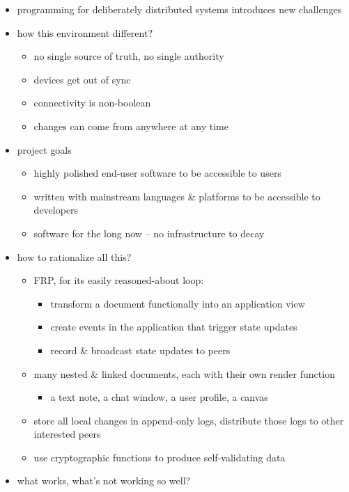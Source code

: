 \documentclass[sigplan,10pt]{acmart}
\begin{document}
\begin{itemize}
    \item programming for deliberately distributed systems introduces new challenges
    \item how this environment different?
    \begin{itemize}
	    \item no single source of truth, no single authority
	    \item devices get out of sync
	    \item connectivity is non-boolean
	    \item changes can come from anywhere at any time
    \end{itemize}
    \item project goals
    \begin{itemize}
        \item highly polished end-user software to be accessible to users
        \item written with mainstream languages \& platforms to be accessible to developers
        \item software for the long now -- no infrastructure to decay
    \end{itemize}
    \item how to rationalize all this?
    \begin{itemize}
	    \item FRP, for its easily reasoned-about loop: 
	    \begin{itemize}
			 \item transform a document functionally into an application view
			 \item create events in the application that trigger state updates
			 \item record \& broadcast state updates to peers
		\end{itemize}
	    \item many nested \& linked documents, each with their own render function
	    \begin{itemize}
		    \item a text note, a chat window, a user profile, a canvas
		\end{itemize}
	    \item store all local changes in append-only logs, distribute those logs to other interested peers
	    \item use cryptographic functions to produce self-validating data
	\end{itemize}
    \item what works, what's not working so well?

\end{itemize}
\end{document}
